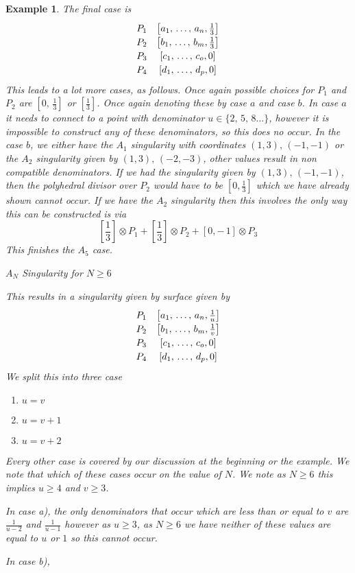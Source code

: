 \documentclass[12pt,a4paper]{book}      %
\newtheorem{ex}[thm]{Example}
\begin{document}
\begin{ex}
The final case is 
\[\def\arraystretch{1.2}
\begin{array}{cc}
P_1 & \left[ a_1, \, \dots , \, a_n, \frac{1}{3} \right] \\ 
P_2 & \left[b_1 , \, \dots, \, b_m, \frac{1}{3} \right] \\
P_3 & \left[c_1, \, \dots, \, c_o, 0\right] \\
P_4 & \left[d_1, \, \dots, \, d_p, 0\right]  \\
\end{array}
\]
This leads to a lot more cases, as follows. Once again possible choices for $P_1$ and $P_2$ are $\left[ 0, \, \frac{1}{3} \right]$ or $\left[ \frac{1}{3} \right]$. Once again denoting these by case $a$ and case $b$. In case $a$ it needs to connect to a point with denominator $ u \in \{2, \, 5, \, 8 \dots \}$, however it is impossible to construct any of these denominators, so this does no occur. In the case $b$, we either have the $A_1$ singularity with coordinates $(1, 3),\, (-1, -1)$ or the $A_2$ singularity given by $(1, 3),\, (-2, -3)$, other values result in non compatible denominators. If we had the singularity given by $(1, 3),\, (-1, -1)$, then the polyhedral divisor over $P_2$ would have to be $\left[ 0, \frac{1}{3} \right]$ which we have already shown cannot occur. If we have the $A_2$ singularity then this involves the only way this can be constructed is via 
\[
\left[\frac{1}{3} \right] \otimes P_1 + \left[\frac{1}{3} \right] \otimes P_2 + [0, -\, 1] \otimes P_3
\]
This finishes the $A_5$ case.

\item \begin{bf} $A_N$ Singularity for $N \geq 6$ \end{bf}

This results in a singularity given by surface given by 
\[\def\arraystretch{1.2}
\begin{array}{cc}
P_1 & \left[ a_1, \, \dots , \, a_n, \frac{1}{u} \right] \\ 
P_2 & \left[b_1 , \, \dots, \, b_m, \frac{1}{v} \right] \\
P_3 & \left[c_1, \, \dots, \, c_o, 0\right] \\
P_4 & \left[d_1, \, \dots, \, d_p, 0\right]  \\
\end{array}
\]
We split this into three case 
\begin{enumerate}[label =\alph*)]
\item $u = v$
\item $u = v + 1$
\item $u = v + 2$
\end{enumerate}
Every other case is covered by our discussion at the beginning or the example. We note that which of these cases occur on the value of $N$. We note as $N \geq 6$ this implies $u \geq 4$ and $v \geq 3$.

In case a), the only denominators that occur which are less than or equal to $v$ are $\frac{1}{u-2}$ and $\frac{1}{u-1}$ however as $u \geq 3$, as $N \geq 6$ we have neither of these values are equal to $u$ or $1$ so this cannot occur.

In case b), 
\end{ex}
\end{document}
